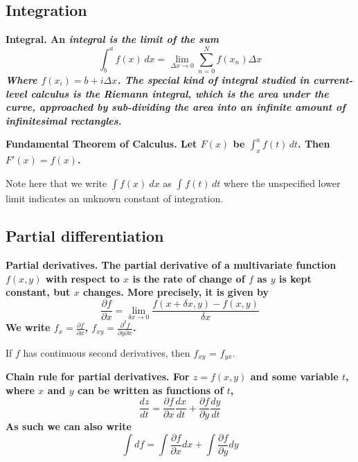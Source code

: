 \documentclass{article}
\begin{document}
\subsection{Integration}
\begin{definition}
\bf{Integral}. \normalfont An \it integral \normalfont is the limit of the sum \begin{equation*}
\int_{b}^{a} f(x) \,dx =  \lim_{\Delta x \to 0} \sum_{n = 0}^{N} f(x_n) \Delta x    
\end{equation*}
Where $f(x_i) = b + i\Delta x$. The special kind of integral studied in current-level calculus is the Riemann integral, which is the area under the curve, approached by sub-dividing the area into an infinite amount of infinitesimal rectangles.

\end{definition}
\begin{theorem}
\bf Fundamental Theorem of Calculus. \normalfont Let $F(x)$ be $\int_{x}^{a} f(t) \,dt$. Then $F'(x) = f(x)$. 
\end{theorem}
Note here that we write $\int f(x) \ dx$ as $\int_{}^{} f(t) \,dt$ where the unspecified lower limit indicates an unknown constant of integration. 

\subsection{Partial differentiation}
\begin{definition}
\bf Partial derivatives. \normalfont The partial derivative of a multivariate function $f(x,y)$ with respect to $x$ is the rate of change of $f$ as $y$ is kept constant, but $x$ changes. More precisely, it is given by \begin{equation*}
    \frac{\partial f}{\partial x} = \lim_{\delta x \to 0} \frac{f(x+\delta x, y) - f(x,y)}{\delta x}
\end{equation*}
We write $f_x = \frac{\partial f}{\partial x}$, $f_{xy} = \frac{\partial^2 f}{\partial y \partial x}$.

\end{definition}
\begin{theorem}
If $f$ has continuous second derivatives, then $f_{xy}$ = $f_{yx}$.
\end{theorem}
\begin{theorem}
\bf Chain rule for partial derivatives. \normalfont For $z=f(x,y)$ and some variable $t$, where $x$ and $y$ can be written as functions of $t$,
\begin{equation*}
\frac{dz}{dt}=\frac{\partial f}{\partial x} \frac{dx}{dt} + \frac{\partial f}{\partial y} \frac{dy}{dt}
\end{equation*}
As such we can also write
\begin{equation*}
\int df =  \int \frac{\partial f}{\partial x} dx + \int \frac{\partial f}{\partial y} dy
\end{equation*}
\end{theorem}
\end{document}
